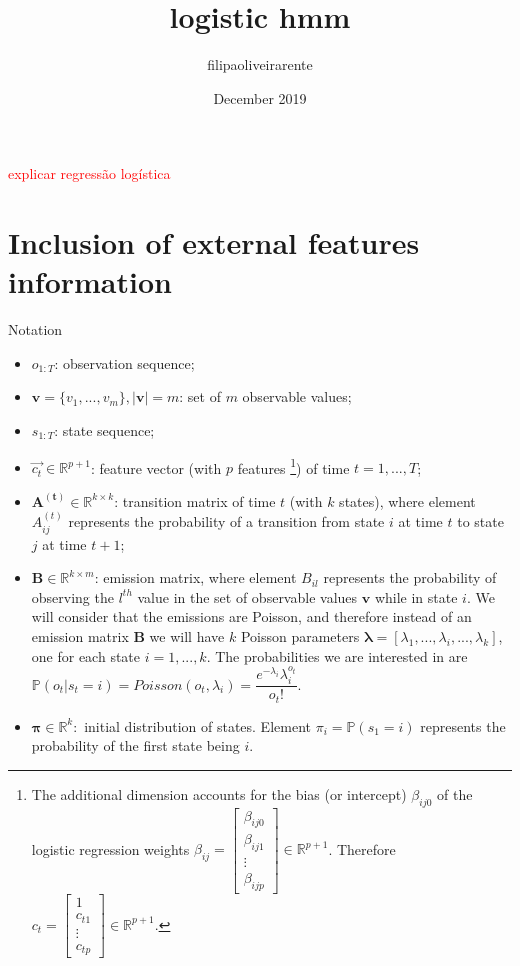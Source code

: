\documentclass{article}
\title{logistic hmm}
\author{filipaoliveirarente }
\date{December 2019}
\begin{document}
\maketitle

\noindent
\textcolor{red}{explicar regressão logística}
\section{Inclusion of external features information}


Notation
\begin{itemize}
    \item $o_{1:T}$: observation sequence;
    \item $\boldsymbol{v} = \{v_1,...,v_m\}, |\boldsymbol{v}|=m$: set of $m$ observable values;
    \item $s_{1:T}$: state sequence;
    \item $\Vec{c_t} \in \mathbb{R}^{p+1}$: feature vector (with $p$ features \footnote{The additional dimension accounts for the bias (or intercept) $\beta_{ij0}$ of the logistic regression weights $\beta_{ij} = \begin{bmatrix} \beta_{ij0}\\
    \beta_{ij1} \\ \vdots \\ \beta_{ijp} \end{bmatrix} \in \mathbb{R}^{p+1}$. Therefore $c_t = \begin{bmatrix} 1\\
    c_{t1} \\ \vdots \\ c_{tp} \end{bmatrix} \in \mathbb{R}^{p+1}$.}) of time $t=1,...,T$;
    \item $\boldsymbol{A^{(t)}}\in \mathbb{R}^{k \times k}$: transition matrix of time $t$ (with $k$ states), where element $A_{ij}^{(t)}$ represents the probability of a transition from state $i$ at time $t$ to state $j$ at time $t+1$;
    \item $\boldsymbol{B} \in \mathbb{R}^{k \times m}$: emission matrix, where element $B_{il}$ represents the probability of observing the $l^{th}$ value in the set of observable values $\boldsymbol{v}$  while in state $i$. We will consider that the emissions are Poisson, and therefore instead of an emission matrix $\boldsymbol{B}$ we will have $k$ Poisson parameters $\boldsymbol{\lambda} = [\lambda_1,...,\lambda_i,...,\lambda_k]$, one for each state $i=1,...,k$. The probabilities we are interested in are $\mathbb{P}(o_t|s_t=i)= Poisson(o_t, \lambda_i) = \dfrac{e^{-\lambda_i} \lambda_i^{o_t}}{o_t!}.$
    \item $\boldsymbol{\pi} \in \mathbb{R}^k:$ initial distribution of states. Element $\pi_i=\mathbb{P}(s_1=i)$ represents the probability of the first state being $i$.
\end{itemize}
\end{document}
